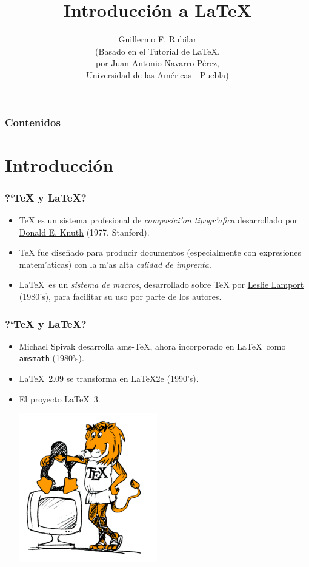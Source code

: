 \documentclass[hyperref={colorlinks}]{beamer}
\begin{document}
\title[\LaTeX]{Introducci\'on a \LaTeX}
\author[G.R.]{{Guillermo F. Rubilar} \\ \tiny (Basado en el Tutorial de \LaTeX ,\\
por Juan Antonio Navarro P\'{e}rez, \\Universidad de las Am\'{e}ricas - Puebla)}
\frame{\titlepage}


\begin{frame}
\frametitle{Contenidos}
\tableofcontents
\end{frame}


\section{Introducci\'on}
\begin{frame}[fragile]\frametitle{?`\TeX{} y \LaTeX?}
\begin{itemize}
\item \TeX{} es un sistema profesional de \emph{composici'on tipogr'afica} desarrollado
por \href{http://www-cs-faculty.stanford.edu/~knuth}{Donald E. Knuth} (1977, Stanford).
\item \TeX{} fue dise\~nado para producir documentos (especialmente con expresiones matem'aticas) con la m'as alta \emph{calidad de imprenta}.
\item \LaTeX\ es un \emph{sistema de macros}, desarrollado sobre \TeX{} por \href{https://es.wikipedia.org/wiki/Leslie_Lamport}{Leslie Lamport} (1980's), para facilitar su uso por parte de los autores.
\end{itemize}
\end{frame}

\begin{frame}[fragile]\frametitle{?`\TeX{} y \LaTeX?}
\begin{itemize}
\item Michael Spivak desarrolla ams-TeX, ahora incorporado en \LaTeX\ como \texttt{amsmath} 
(1980's).
  \item \LaTeX\ 2.09 se transforma en \LaTeX2e (1990's).
  \item El proyecto \LaTeX\ 3. 
	\begin{center}
		\includegraphics[width=6cm]{figs/tux26.pdf}
	\end{center}
\end{itemize}
\end{frame}
\end{document}

